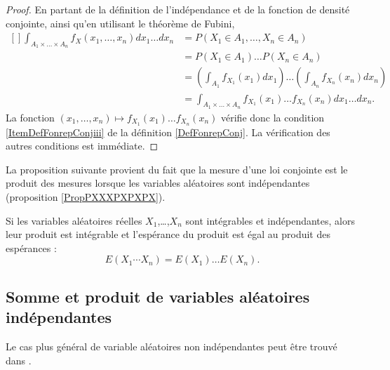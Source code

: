 \begin{proof}
    En partant de la définition de l'indépendance et de la fonction de densité conjointe, ainsi qu'en utilisant le théorème de Fubini,
    \begin{equation}
        \begin{aligned}[]
            \int_{A_1\times \ldots\times A_n}f_X(x_1,\ldots,x_n)dx_1\ldots dx_n&=
            P(X_1\in A_1,\ldots,X_n\in A_n)\\
            &=P(X_1\in A_1)\ldots P(X_n\in A_n)\\
            &=\left( \int_{A_1}f_{X_1}(x_1)dx_1 \right)\ldots\left( \int_{A_n}f_{X_n}(x_n)dx_n \right)\\
            &=\int_{A_1\times\ldots\times A_n}f_{X_1}(x_1)\ldots f_{X_n}(x_n)dx_1\ldots dx_n.
        \end{aligned}
    \end{equation}
    La fonction \( (x_1,\ldots,x_n)\mapsto f_{X_1}(x_1)\ldots f_{X_n}(x_n)\) vérifie donc la condition \ref{ItemDefFonrepConjiii} de la définition \ref{DefFonrepConj}. La vérification des autres conditions est immédiate.
\end{proof}


La proposition suivante\cite{ProbaDanielLi} provient du fait que la mesure d'une loi conjointe est le produit des mesures lorsque les variables aléatoires sont indépendantes (proposition \ref{PropPXXXPXPXPX}).
\begin{proposition}
    Si les variables aléatoires réelles \( X_1\),\ldots,\( X_n\) sont intégrables et indépendantes, alors leur produit est intégrable et l'espérance du produit est égal au produit des espérances :
    \begin{equation}
        E(X_1\cdots X_n)=E(X_1)\ldots E(X_n).
    \end{equation}
\end{proposition}

\subsection{Somme et produit de variables aléatoires indépendantes}
\label{subsecscnvommevariablsindep}

Le cas plus général de variable aléatoires non indépendantes peut être trouvé dans \cite{Marazzi}.

